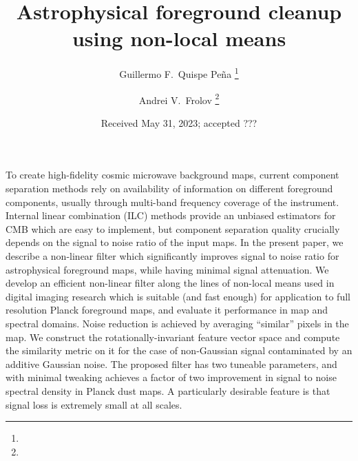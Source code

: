 \documentclass{aa}
\begin{document}
   \title{Astrophysical foreground cleanup using non-local means}
   
   \author{Guillermo F.\ Quispe Pe\~na
      \fnmsep\thanks{}
   \and
      Andrei V.\ Frolov
      \fnmsep\thanks{}
   }
   

   \date{Received May 31, 2023; accepted ???}

 
  \abstract
   {To create high-fidelity cosmic microwave background maps, current component separation methods rely on availability of information on different foreground components, usually through multi-band frequency coverage of the instrument. Internal linear combination (ILC) methods provide an unbiased estimators for CMB which are easy to implement, but component separation quality crucially depends on the signal to noise ratio of the input maps. In the present paper, we describe a non-linear filter which significantly improves signal to noise ratio for astrophysical foreground maps, while having minimal signal attenuation.}
   {We develop an efficient non-linear filter along the lines of non-local means used in digital imaging research which is suitable (and fast enough) for application to full resolution Planck foreground maps, and evaluate it performance in map and spectral domains.}
   {Noise reduction is achieved by averaging ``similar'' pixels in the map. We construct the rotationally-invariant feature vector space and compute the similarity metric on it for the case of non-Gaussian signal contaminated by an additive Gaussian noise.}
   {The proposed filter has two tuneable parameters, and with minimal tweaking achieves a factor of two improvement in signal to noise spectral density in Planck dust maps. A particularly desirable feature is that signal loss is extremely small at all scales.}
   {}
   

   \maketitle
%
\end{document}
